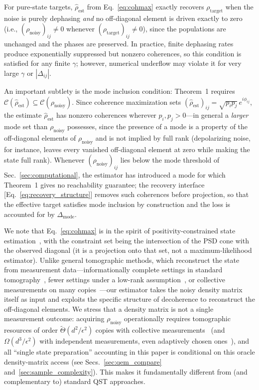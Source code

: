 \documentclass[12pt,a4paper]{article}
\newcommand{\CC}{\mathcal{C}}
\newcommand{\rhot}{\rho_\mathrm{target}}
\newcommand{\rhon}{\rho_\mathrm{noisy}}
\newcommand{\rhoe}{\hat{\rho}_\mathrm{est}}
\begin{document}
For pure-state targets, $\rhoe$ from Eq.~\eqref{eq:cohmax} exactly recovers $\rhot$ when the noise is purely dephasing \emph{and} no off-diagonal element is driven exactly to zero (i.e., $(\rhon)_{ij} \neq 0$ whenever $(\rhot)_{ij} \neq 0$), since the populations are unchanged and the phases are preserved.
In practice, finite dephasing rates produce exponentially suppressed but nonzero coherences, so this condition is satisfied for any finite $\gamma$; however, numerical underflow may violate it for very large $\gamma$ or $|\Delta_{ij}|$.

An important subtlety is the mode inclusion condition: Theorem~1 requires $\CC(\rhoe) \subseteq \CC(\rhon)$.
Since coherence maximization sets $(\rhoe)_{ij} = \sqrt{p_i p_j}\,e^{i\phi_{ij}}$, the estimate $\rhoe$ has nonzero coherences wherever $p_i, p_j > 0$---in general a \emph{larger} mode set than $\rhon$ possesses, since the presence of a mode is a property of the off-diagonal elements of $\rhon$ and is not implied by full rank (depolarizing noise, for instance, leaves every vanished off-diagonal element at zero while making the state full rank).
Whenever $(\rhon)_{ij}$ lies below the mode threshold of Sec.~\ref{sec:computational}, the estimator has introduced a mode for which Theorem~1 gives no reachability guarantee; the recovery interface [Eq.~\eqref{eq:recovery_structure}] removes such coherences before projection, so that the effective target satisfies mode inclusion by construction and the loss is accounted for by $\Delta_\mathrm{mode}$.

We note that Eq.~\eqref{eq:cohmax} is in the spirit of positivity-constrained state estimation~\cite{Hradil1997}, with the constraint set being the intersection of the PSD cone with the observed diagonal (it is a projection onto that set, not a maximum-likelihood estimator).
Unlike general tomographic methods, which reconstruct the state from measurement data---informationally complete settings in standard tomography~\cite{Hradil1997}, fewer settings under a low-rank assumption~\cite{Gross2010}, or collective measurements on many copies~\cite{Haah2017}---our estimator takes the noisy density matrix itself as input and exploits the specific structure of decoherence to reconstruct the off-diagonal elements.
We stress that a density matrix is not a single measurement outcome: acquiring $\rhon$ operationally requires tomographic resources of order $\tilde\Theta(d^2/\epsilon^2)$ copies with collective measurements~\cite{Haah2017,ODonnellWright2016,Anshu2024survey} (and $\Omega(d^3/\epsilon^2)$ with independent measurements, even adaptively chosen ones~\cite{Haah2017,Chen2023adaptivity}), and all ``single state preparation'' accounting in this paper is conditional on this oracle density-matrix access (see Secs.~\ref{sec:qem_compare} and~\ref{sec:sample_complexity}).
This makes it fundamentally different from (and complementary to) standard QST approaches.
\end{document}
